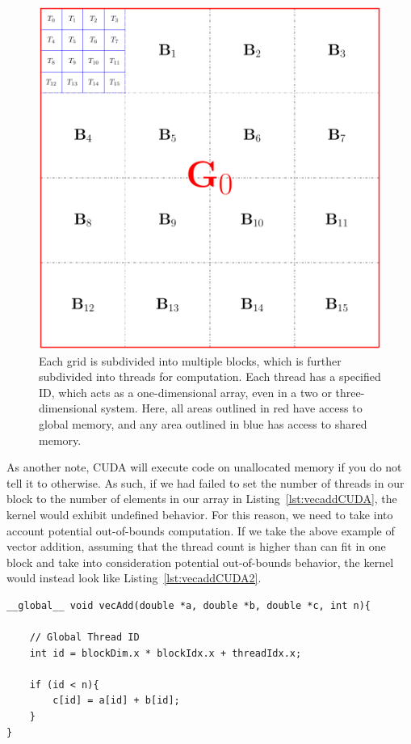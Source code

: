 \begin{figure}
\includegraphics[width=\textwidth]{data/gpu/gputhreads.pdf}
\caption{Each grid is subdivided into multiple blocks, which is further subdivided into threads for computation. Each thread has a specified ID, which acts as a one-dimensional array, even in a two or three-dimensional system. Here, all areas outlined in red have access to global memory, and any area outlined in blue has access to shared memory. }
\label{fig:threadsnblocks}
\end{figure}

As another note, CUDA will execute code on unallocated memory if you do not tell it to otherwise.
As such, if we had failed to set the number of threads in our block to the number of elements in our array in Listing~\ref{lst:vecaddCUDA}, the kernel would exhibit undefined behavior.
For this reason, we need to take into account potential out-of-bounds computation.
If we take the above example of vector addition, assuming that the thread count is higher than can fit in one block and take into consideration potential out-of-bounds behavior, the kernel would instead look like Listing~\ref{lst:vecaddCUDA2}.

\begin{lstlisting}[float,label=lst:vecaddCUDA2, style=c++,caption={An example of a vector addition kernel in CUDA using blocks and threads, and ensuring no computation happens beyond the size of the array, $n$.}]
__global__ void vecAdd(double *a, double *b, double *c, int n){

    // Global Thread ID
    int id = blockDim.x * blockIdx.x + threadIdx.x;

    if (id < n){
        c[id] = a[id] + b[id];
    }
}
\end{lstlisting}

